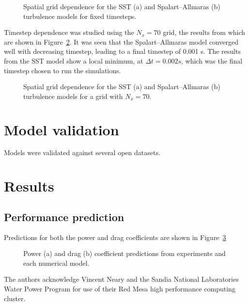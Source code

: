 \documentclass[aip,graphicx]{revtex4-1}
\begin{document}
\begin{figure}[ht]
\caption{Spatial grid dependence for the SST (a) and Spalart--Allmaras (b) 
turbulence models for fixed timesteps.}
\label{fig:spatial-grid-dep}
\end{figure}

Timestep dependence was studied using the $N_x=70$ grid, the results from which
are shown in Figure~\ref{fig:timestep-dep}. It was seen that the
Spalart--Allmaras model converged well with decreasing timestep, leading to a
final timestep of 0.001 s. The results from the SST model show a local minimum,
at $\Delta t = 0.002 s$, which was the final timestep chosen to run the
simulations.

\begin{figure}[ht]
\caption{Spatial grid dependence for the SST (a) and Spalart--Allmaras (b) 
turbulence models for a grid with $N_x=70$.}
\label{fig:timestep-dep}
\end{figure}

\section{Model validation}

Models were validated against several open datasets.


\section{Results}

\subsection{Performance prediction}

Predictions for both the power and drag coefficients are shown in Figure~\ref{fig:perf-comp}

\begin{figure}[ht]
\caption{Power (a) and drag (b) coefficient predictions from experiments and
each numerical model.}
\label{fig:perf-comp}
\end{figure}






\begin{acknowledgments}
The authors acknowledge Vincent Neary and the Sandia National Laboratories Water
Power Program for use of their Red Mesa high performance computing cluster.
\end{acknowledgments}


\end{document}

